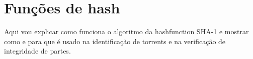 
\section{Funções de hash}
\label{sec:sha1}

Aqui vou explicar como funciona o algoritmo da \gls{hashfunction} SHA-1 e mostrar como
e para que é usado na identificação de torrents e na verificação de integridade de
partes.
